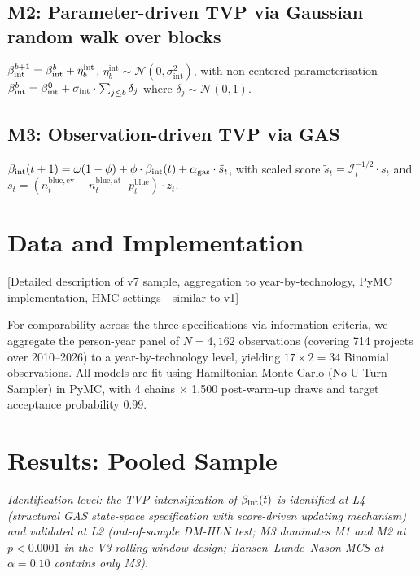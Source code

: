 \subsection*{M2: Parameter-driven TVP via Gaussian random walk over blocks}
$\beta_{\mathrm{int}}^{b+1} = \beta_{\mathrm{int}}^b + \eta_b^{\mathrm{int}}$, $\eta_b^{\mathrm{int}} \sim \mathcal{N}(0, \sigma^2_{\mathrm{int}})$, with non-centered parameterisation $\beta_{\mathrm{int}}^b = \beta_{\mathrm{int}}^0 + \sigma_{\mathrm{int}} \cdot \sum_{j \leq b} \delta_j$ where $\delta_j \sim \mathcal{N}(0,1)$.

\subsection*{M3: Observation-driven TVP via GAS}
$\beta_{\mathrm{int}}(t+1) = \omega(1-\phi) + \phi \cdot \beta_{\mathrm{int}}(t) + \alpha_{\mathrm{gas}} \cdot \tilde{s}_t$,
with scaled score $\tilde{s}_t = \mathcal{I}_t^{-1/2} \cdot s_t$ and $s_t = (n_t^{\mathrm{blue, ev}} - n_t^{\mathrm{blue, at}} \cdot p_t^{\mathrm{blue}}) \cdot z_t$.

\section{Data and Implementation}
\label{sec:ch7-data}

[Detailed description of v7 sample, aggregation to year-by-technology, PyMC implementation, HMC settings - similar to v1]

For comparability across the three specifications via information criteria, we aggregate the person-year panel of $N = 4{,}162$ observations (covering 714 projects over 2010--2026) to a year-by-technology level, yielding $17 \times 2 = 34$ Binomial observations. All models are fit using Hamiltonian Monte Carlo (No-U-Turn Sampler) in PyMC, with 4 chains $\times$ 1{,}500 post-warm-up draws and target acceptance probability 0.99.

\section{Results: Pooled Sample}
\noindent\emph{Identification level: the TVP intensification of $\beta_{\mathrm{int}}(t)$ is identified at L4 (structural GAS state-space specification with score-driven updating mechanism) and validated at L2 (out-of-sample DM-HLN test; M3 dominates M1 and M2 at $p < 0.0001$ in the V3 rolling-window design; Hansen--Lunde--Nason MCS at $\alpha = 0.10$ contains only M3).}

